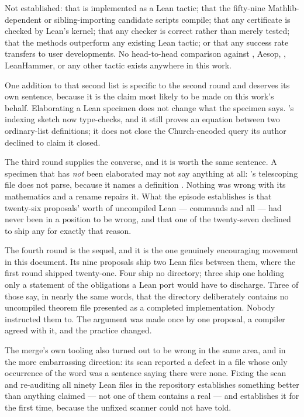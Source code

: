 Not established: that \forge{} is implemented as a Lean tactic; that the
fifty-nine Mathlib-dependent or sibling-importing candidate scripts compile;
that any certificate
is checked by Lean's kernel; that any checker is correct rather than merely
tested; that the methods outperform any existing Lean tactic; or that any
success rate transfers to user developments. No head-to-head comparison against
\grind{}, Aesop, , LeanHammer, or any other tactic exists
anywhere in this work.

One addition to that second list is specific to the second round and deserves
its own sentence, because it is the claim most likely to be made on this work's
behalf. Elaborating a Lean specimen does not change what the specimen says.
's indexing sketch now type-checks, and it still proves an equation
between two ordinary-list definitions; it does not close the Church-encoded
query its author declined to claim it closed.

The third round supplies the converse, and it is worth the same sentence. A
specimen that has \emph{not} been elaborated may not say anything at all:
's telescoping file does not parse, because it names a definition
. Nothing was wrong with its mathematics and a rename repairs it.
What the episode establishes is that twenty-six proposals' worth of uncompiled
Lean ---  commands and all --- had never been in a
position to be wrong, and that one of the twenty-seven declined to ship any for
exactly that reason.

The fourth round is the sequel, and it is the one genuinely encouraging
movement in this document. Its nine proposals ship two Lean files between them,
where the first round shipped twenty-one. Four ship no  directory;
three ship one holding only a statement of the obligations a Lean port would
have to discharge. Three of those say, in nearly the same words, that the
directory deliberately contains no uncompiled theorem file presented as a
completed implementation. Nobody instructed them to. The argument was made once
by one proposal, a compiler agreed with it, and the practice changed.

The merge's own tooling also turned out to be wrong in the same area, and in
the more embarrassing direction: its  scan reported a defect in a
file whose only occurrence of the word was a sentence saying there were none.
Fixing the scan and re-auditing all ninety Lean files in the repository
establishes something better than anything claimed --- not one of them contains
a real  --- and establishes it for the first time, because the
unfixed scanner could not have told.

